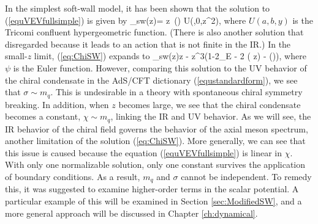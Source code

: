 In the simplest soft-wall model, it has been shown \cite{karch-katz-son-adsqcd,colangelo2008} that the solution to (\ref{equVEVfullsimple}) is given by 
\be
\chi_{sw}(z)=  z \,\Gamma\left(\right) U\left(,0,\lambda z^{2}\right),
\label{eq:ChiSW}
\ee
where $U(a,b,y)$ is the Tricomi confluent hypergeometric function. 
(There is also another solution that disregarded because it leads to an action that is not finite in the IR.)
In the small-$z$ limit, (\ref{eq:ChiSW}) expands to \cite{colangelo2008}
\be
\label{equvevswsolexp}
\chi_{sw}(z)\rightarrow {}z - z^{3}\left(1-2\gamma_{E} - 2 \log(\sqrt{\lambda} z) - \psi\left(\right)\right),
\ee
where $\psi$ is the Euler function.
However, comparing this solution to the UV behavior of the chiral condensate in the AdS/CFT dictionary (\ref{equstandardform}), we see that $\sigma \sim m_q$.
This is undesirable in a theory with spontaneous chiral symmetry breaking.
In addition, when $z$ becomes large, we see that the chiral condensate becomes a constant, $\chi \sim m_q$, linking the IR and UV behavior. 
As we will see, the IR behavior of the chiral field governs the behavior of the axial meson spectrum, another limitation of the solution (\ref{eq:ChiSW}).
More generally, we can see that this issue is caused because the equation (\ref{equVEVfullsimple}) is linear in $\chi$.
With only one normalizable solution, only one constant survives the application of boundary conditions.
As a result, $m_q$ and $\sigma$ cannot be independent.
To remedy this, it was suggested \cite{karch-katz-son-adsqcd} to examine higher-order terms in the scalar potential. 
A particular example of this will be examined in Section \ref{sec:ModifiedSW}, and a more general approach will be discussed in Chapter \ref{ch:dynamical}.

